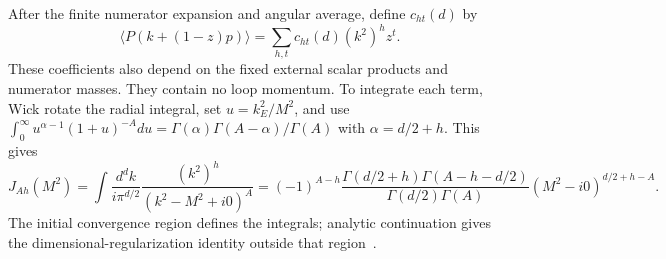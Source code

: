 \documentclass[11pt,a4paper]{article}
\begin{document}
After the finite numerator expansion and angular average, define $c_{ht}(d)$ by
\begin{equation}
 \langle P(k+(1-z)p)\rangle=\sum_{h,t}c_{ht}(d)(k^2)^h z^t.
 \label{notes-light-eq:light-polynomial}
\end{equation}
These coefficients also depend on the fixed external scalar products and numerator masses. They contain no loop momentum. To integrate each term, Wick rotate the radial integral, set $u=k_E^2/M^2$, and use
$\int_0^\infty u^{\alpha-1}(1+u)^{-A}du=\Gamma(\alpha)\Gamma(A-\alpha)/\Gamma(A)$ with $\alpha=d/2+h$. This gives
\begin{equation}
 J_{Ah}(M^2)=\int\frac{d^dk}{i\pi^{d/2}}\frac{(k^2)^h}{(k^2-M^2+i0)^A}
 =(-1)^{A-h}\frac{\Gamma(d/2+h)\Gamma(A-h-d/2)}{\Gamma(d/2)\Gamma(A)}
 (M^2-i0)^{d/2+h-A}.
 \label{notes-light-eq:light-radial}
\end{equation}
The initial convergence region defines the integrals; analytic continuation gives the dimensional-regularization identity outside that region~\cite{Weinzierl2022}.
\end{document}
